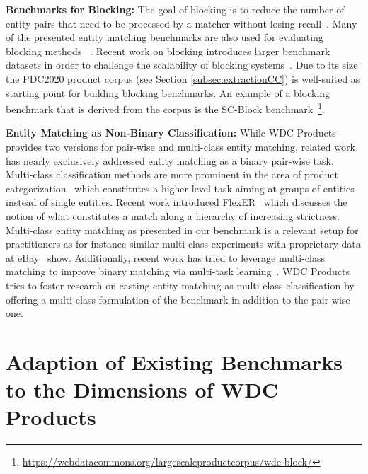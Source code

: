 \documentclass[sigconf,edbt]{acmart-edbt2024}
\begin{document}
\textbf{Benchmarks for Blocking:} The goal of blocking is to reduce the number of entity pairs that need to be processed by a matcher without losing recall~\cite{papadakisBlockingFilteringTechniques2020a}.   Many of the presented entity matching benchmarks are also used for evaluating blocking methods ~\cite{wangSudowoodoContrastiveSelfsupervised2022,brinkmannSCBlockSupervisedContrastive2023,papadakisBlockingFilteringTechniques2020a,papadakisComparativeAnalysisApproximate2016}. Recent work on blocking introduces larger benchmark datasets in order to challenge the scalability of blocking systems~\cite{papadakisComparativeAnalysisApproximate2016, papadakisHowReduceSearch2022}. Due to its size the PDC2020 product corpus (see Section \ref{subsec:extractionCC}) is well-suited as starting point for building blocking benchmarks. An example of a blocking benchmark that is derived from the corpus is the SC-Block benchmark~\cite{brinkmannSCBlockSupervisedContrastive2023}\footnote{\url{https://webdatacommons.org/largescaleproductcorpus/wdc-block/}}.

\textbf{Entity Matching as Non-Binary Classification:} While WDC Products provides two versions for pair-wise and multi-class entity matching, related work has nearly exclusively addressed entity matching as a binary pair-wise task. Multi-class classification methods are more prominent in the area of product categorization~\cite{sillaSurveyHierarchicalClassification2011,gaoDeepHierarchicalClassification2020} which constitutes a higher-level task aiming at groups of entities instead of single entities. Recent work introduced FlexER~\cite{genossarFlexERFlexibleEntity2022} which discusses the notion of what constitutes a match along a hierarchy of increasing strictness. Multi-class entity matching as presented in our benchmark is a relevant setup for practitioners as for instance similar multi-class experiments with proprietary data at eBay~\cite{shahNeuralNetworkBased2018} show. Additionally, recent work has tried to leverage multi-class matching to improve binary matching via multi-task learning~\cite{peetersDualobjectiveFinetuningBERT2021}. WDC Products tries to foster research on casting entity matching as multi-class classification by offering a multi-class formulation of the benchmark in addition to the pair-wise one.


 \balance
\section{Adaption of Existing Benchmarks to the Dimensions of WDC Products} 
\label{sec:adaptionofbenchmarks}
\end{document}
